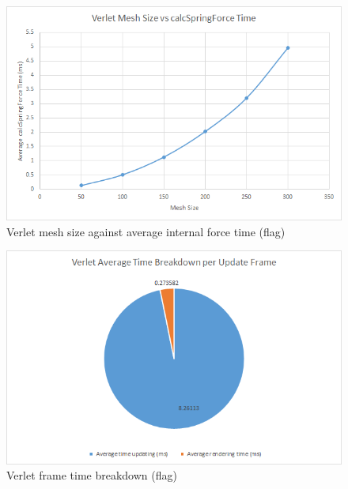     \begin{figure}
    \begin{center}
      \includegraphics[scale=.9]{Figures/flag_v_m_csf}
    \end{center}
    \caption{Verlet mesh size against average internal force time (flag)}
    \label{fig:v mesh csf flag}
  \end{figure}
  
    \begin{figure}
    \begin{center}
      \includegraphics[scale=.9]{Figures/flag_v_ft}
    \end{center}
    \caption{Verlet frame time breakdown (flag)}
    \label{fig:v ft flag}
  \end{figure}
  
